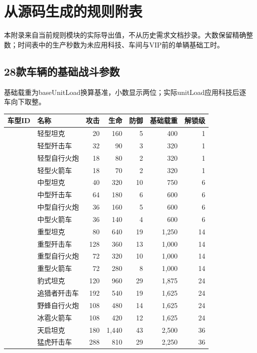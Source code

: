 \chapter{从源码生成的规则附表}
本附录来自当前规则模块的实际导出值，不从历史需求文档抄录。大数保留精确整数；时间表中的生产秒数为未应用科技、车间与VIP前的单辆基础工时。
\section{28款车辆的基础战斗参数}
基础载重为baseUnitLoad换算基准，小数显示两位；实际unitLoad应用科技后逐车向下取整。
\begin{small}
\begin{longtable}{@{}P{35mm}P{24mm}rrrrr@{}}
\toprule 车型ID & 名称 & 攻击 & 生命 & 防御 & 基础载重 & 解锁级 \\
\midrule\endhead
{} & 轻型坦克 & 20 & 160 & 5 & 400 & 1 \\
 & 轻型歼击车 & 32 & 90 & 3 & 320 & 1 \\
 & 轻型自行火炮 & 18 & 80 & 2 & 320 & 1 \\
 & 轻型火箭车 & 18 & 70 & 2 & 320 & 1 \\
 & 中型坦克 & 40 & 320 & 10 & 750 & 6 \\
 & 中型歼击车 & 64 & 180 & 6 & 600 & 6 \\
 & 中型自行火炮 & 36 & 160 & 5 & 600 & 6 \\
 & 中型火箭车 & 36 & 140 & 4 & 600 & 6 \\
 & 重型坦克 & 80 & 640 & 19 & 1,250 & 14 \\
 & 重型歼击车 & 128 & 360 & 13 & 1,000 & 14 \\
 & 重型自行火炮 & 72 & 320 & 10 & 1,000 & 14 \\
 & 重型火箭车 & 72 & 280 & 8 & 1,000 & 14 \\
 & 豹式坦克 & 120 & 960 & 29 & 1,875 & 24 \\
 & 追猎者歼击车 & 192 & 540 & 19 & 1,625 & 24 \\
 & 野蜂自行火炮 & 108 & 480 & 14 & 1,625 & 24 \\
 & 冰雹火箭车 & 108 & 420 & 12 & 1,625 & 24 \\
 & 天启坦克 & 180 & 1,440 & 43 & 2,500 & 36 \\
 & 猛虎歼击车 & 288 & 810 & 29 & 2,250 & 36 \\

\end{longtable}
\end{small}
